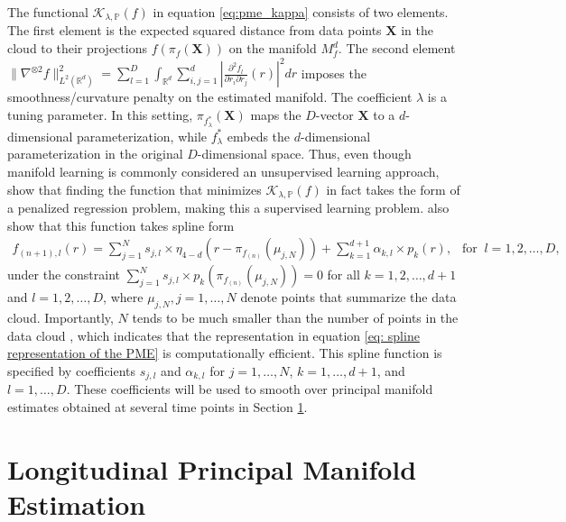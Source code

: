 \documentclass[12pt]{article}
\theoremstyle{definition}
\begin{document}
The functional $\mathcal{K}_{\lambda, \mathbb{P}}(f)$ in equation \eqref{eq:pme_kappa} consists of two elements. The first element is the expected squared distance from data points $\mathbf{X}$ in the cloud to their projections $f(\pi_f(\mathbf{X}))$ on the manifold $M_f^d$. The second element $\|\nabla^{\otimes 2}f\|_{L^2(\mathbb{R}^{d})}^2 = \sum_{l=1}^{D} \int_{\mathbb{R}^{d}}\sum_{i, j = 1}^{d}\left|\frac{\partial^2f_l}{\partial r_i \partial r_j}(r)\right|^2dr$ imposes the smoothness/curvature penalty on the estimated manifold. The coefficient $\lambda$ is a tuning parameter. In this setting,  $\pi_{f_{\lambda}^{*}}(\mathbf{X})$ maps the $D$-vector $\mathbf{X}$ to a $d$-dimensional parameterization, while $f_{\lambda}^{*}$ embeds the $d$-dimensional parameterization in the original $D$-dimensional space. Thus, even though manifold learning is commonly considered an unsupervised learning approach, \cite{mengPrincipalManifoldEstimation2021} show that finding the function that minimizes $\mathcal{K}_{\lambda, \mathbb{P}}(f)$ in fact takes the form of a penalized regression problem, making this a supervised learning problem. \cite{mengPrincipalManifoldEstimation2021} also show that this function takes spline form
\begin{align}\label{eq: spline representation of the PME}
    f_{(n+1), l}(r) = \sum_{j=1}^N s_{j, l} \times \eta_{4-d}\left(r - \pi_{f_{(n)}}(\mu_{j, N})\right) + \sum_{k=1}^{d + 1}\alpha_{k, l} \times p_k(r), \ \ \text{ for } \ l = 1, 2, \dots, D,
\end{align}
under the constraint $\sum_{j=1}^{N}s_{j, l} \times p_{k}\left(\pi_{f_{(n)}}(\mu_{j, N})\right) = 0$ for all $k = 1, 2, \dots, d + 1$ and $l = 1, 2, \dots, D$, where $\mu_{j, N}, j = 1, \dots, N$ denote points that summarize the data cloud. Importantly, $N$ tends to be much smaller than the number of points in the data cloud \citep[fig. 3]{mengPrincipalManifoldEstimation2021}, which indicates that the representation in equation \eqref{eq: spline representation of the PME} is computationally efficient. This spline function is specified by coefficients $s_{j, l}$ and $\alpha_{k, l}$ for $j = 1, \dots, N$, $k = 1, \dots, d+1$, and $l = 1, \dots, D$. These coefficients will be used to smooth over principal manifold estimates obtained at several time points in Section \ref{s:LPME}.






\section{Longitudinal Principal Manifold Estimation}\label{s:LPME}
\end{document}
